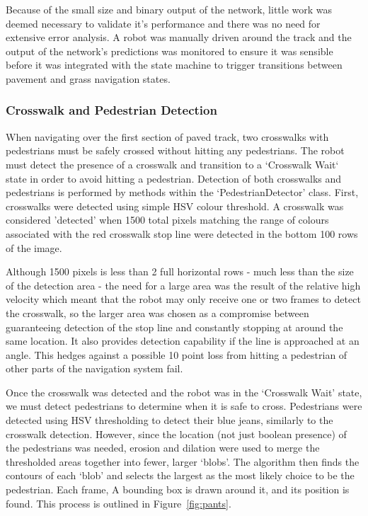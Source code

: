 \documentclass[titlepage, twocolumn]{article}
\begin{document}
            Because of the small size and binary output of the network, little work was deemed necessary to validate it's performance and there was no need for extensive error analysis. A robot was manually driven around the track and the output of the network's predictions was monitored to ensure it was sensible before it was integrated with the state machine to trigger transitions between pavement and grass navigation states.

        \subsubsection{Crosswalk and Pedestrian Detection}
            When navigating over the first section of paved track, two crosswalks with pedestrians must be safely crossed without hitting any pedestrians. The robot must detect the presence of a crosswalk and transition to a `Crosswalk Wait` state in order to avoid hitting a pedestrian. Detection of both crosswalks and pedestrians is performed by methods within the `PedestrianDetector' class. First, crosswalks were detected using simple HSV colour threshold. A crosswalk was considered 'detected' when 1500 total pixels matching the range of colours associated with the red crosswalk stop line were detected in the bottom 100 rows of the image. 
            
            Although 1500 pixels is less than 2 full horizontal rows - much less than the size of the detection area - the need for a large area was the result of the relative high velocity which meant that the robot may only receive one or two frames to detect the crosswalk, so the larger area was chosen as a compromise between guaranteeing detection of the stop line and constantly stopping at around the same location. It also provides detection capability if the line is approached at an angle. This hedges against a possible 10 point loss from hitting a pedestrian of other parts of the navigation system fail.

            Once the crosswalk was detected and the robot was in the `Crosswalk Wait' state, we must detect pedestrians to determine when it is safe to cross. Pedestrians were detected using HSV thresholding to detect their blue jeans, similarly to the crosswalk detection. However, since the location (not just boolean presence) of the pedestrians was needed, erosion and dilation were used to merge the thresholded areas together into fewer, larger `blobs'. The algorithm then finds the contours of each `blob' and selects the largest as the most likely choice to be the pedestrian. Each frame, A bounding box is drawn around it, and its position is found. This process is outlined in Figure~\ref{fig:pants}.
\end{document}
